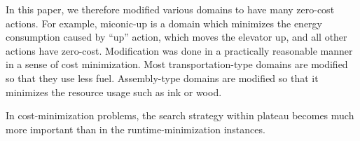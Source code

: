 


In this paper, we therefore modified various domains to have many
zero-cost actions.  For example, miconic-up is a domain which minimizes
the energy consumption caused by ``up'' action, which moves the elevator
up, and all other actions have zero-cost.  Modification was done in a
practically reasonable manner in a sense of cost minimization. Most
transportation-type domains are modified so that they use less
fuel. Assembly-type domains are modified so that it minimizes the
resource usage such as ink or wood.  


 In
cost-minimization problems, the search strategy within plateau becomes
much more important than in the runtime-minimization instances.

